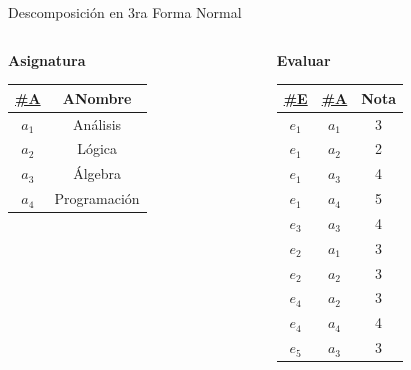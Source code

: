 \begin{frame}{Descomposici\'on en 3ra Forma Normal}
\begin{columns}[T]
\begin{column}{0.68\linewidth}
\begin{columns}[T]
            \end{columns}

            \begin{center}
                \textbf{Asignatura}\\[2mm]

                \begin{tabular}{cc}
                    \underline{\#A} & ANombre\\[1mm]
                    \hline
                    $a_1$ & An\'alisis\\
                    $a_2$ & L\'ogica \\
                    $a_3$ & \'Algebra\\
                    $a_4$ & Programaci\'on
                    
                \end{tabular}
            \end{center}
            
        \end{column}

        \begin{column}{0.3\linewidth}
            \vspace{6mm}
            \begin{center}
                \textbf{Evaluar}\\[2mm]

                \begin{tabular}{ccc}
                    \underline{\#E} & \underline{\#A} & Nota\\[1mm]
                    \hline
                    $e_1$ & $a_1$ & 3\\
                    $e_1$ & $a_2$ & 2\\
                    $e_1$ & $a_3$ & 4\\
                    $e_1$ & $a_4$ & 5\\
                    $e_3$ & $a_3$ & 4\\
                    $e_2$ & $a_1$ & 3\\
                    $e_2$ & $a_2$ & 3\\
                    $e_4$ & $a_2$ & 3\\
                    $e_4$ & $a_4$ & 4\\
                    $e_5$ & $a_3$ & 3\\
                \end{tabular}
            \end{center}
        \end{column}
    \end{columns}
    
\end{frame}


